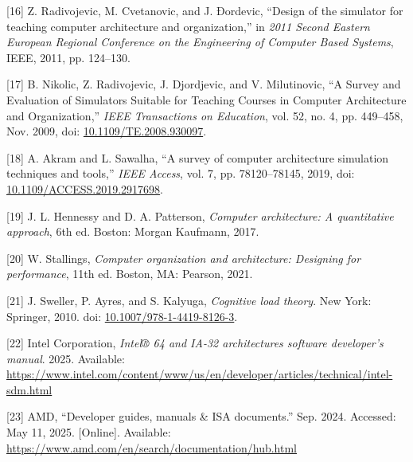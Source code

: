 \documentclass[12pt,oneside]{templates/unerthesis}
\newcommand{\CSLLeftMargin}[1]{#1} %
\newcommand{\CSLRightInline}[1]{#1} %
\newlength{\cslhangindent}
\newenvironment{CSLReferences}[2] %
 {\setlength{\parindent}{0pt}%
  \setlength{\leftskip}{#1 pt\relax}%
  \setlength{\parskip}{#2 pt\relax}%
  \everypar{\setlength{\hangindent}{\cslhangindent}}}
 {\par}
\begin{document}
\begin{CSLReferences}{0}{0}
\leavevmode{}%
\CSLLeftMargin{{[}16{]} }%
\CSLRightInline{Z. Radivojevic, M. Cvetanovic, and J. Ðordevic, {``Design of the simulator for teaching computer architecture and organization,''} in \emph{2011 {Second} {Eastern} {European} {Regional} {Conference} on the {Engineering} of {Computer} {Based} {Systems}}, IEEE, 2011, pp. 124--130.}

\leavevmode{}%
\CSLLeftMargin{{[}17{]} }%
\CSLRightInline{B. Nikolic, Z. Radivojevic, J. Djordjevic, and V. Milutinovic, {``A {Survey} and {Evaluation} of {Simulators} {Suitable} for {Teaching} {Courses} in {Computer} {Architecture} and {Organization},''} \emph{IEEE Transactions on Education}, vol. 52, no. 4, pp. 449--458, Nov. 2009, doi: \href{https://doi.org/10.1109/TE.2008.930097}{10.1109/TE.2008.930097}.}

\leavevmode{}%
\CSLLeftMargin{{[}18{]} }%
\CSLRightInline{A. Akram and L. Sawalha, {``A survey of computer architecture simulation techniques and tools,''} \emph{IEEE Access}, vol. 7, pp. 78120--78145, 2019, doi: \href{https://doi.org/10.1109/ACCESS.2019.2917698}{10.1109/ACCESS.2019.2917698}.}

\leavevmode{}%
\CSLLeftMargin{{[}19{]} }%
\CSLRightInline{J. L. Hennessy and D. A. Patterson, \emph{Computer architecture: A quantitative approach}, 6th ed. Boston: Morgan Kaufmann, 2017.}

\leavevmode{}%
\CSLLeftMargin{{[}20{]} }%
\CSLRightInline{W. Stallings, \emph{Computer organization and architecture: Designing for performance}, 11th ed. Boston, MA: Pearson, 2021.}

\leavevmode{}%
\CSLLeftMargin{{[}21{]} }%
\CSLRightInline{J. Sweller, P. Ayres, and S. Kalyuga, \emph{Cognitive load theory}. New York: Springer, 2010. doi: \href{https://doi.org/10.1007/978-1-4419-8126-3}{10.1007/978-1-4419-8126-3}.}

\leavevmode{}%
\CSLLeftMargin{{[}22{]} }%
\CSLRightInline{Intel Corporation, \emph{Intel® 64 and IA-32 architectures software developer's manual}. 2025. Available: \url{https://www.intel.com/content/www/us/en/developer/articles/technical/intel-sdm.html}}

\leavevmode{}%
\CSLLeftMargin{{[}23{]} }%
\CSLRightInline{AMD, {``Developer guides, manuals \& ISA documents.''} Sep. 2024. Accessed: May 11, 2025. {[}Online{]}. Available: \url{https://www.amd.com/en/search/documentation/hub.html}}


\end{CSLReferences}
\end{document}
